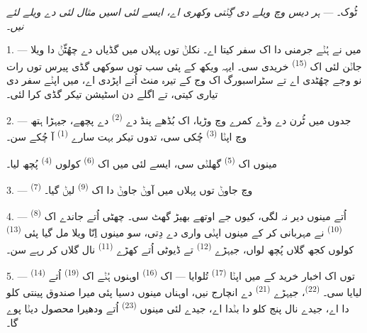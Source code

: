 
\VUsaut{4.0mm}
\VUsaut{2.4mm}
\VUsaut{3.4mm}
\textsc{ٹُوک۔} --- \textit{ہر دیس وچ ویلے دی گِݨتی وکھری اے، ایسے لئی اسیں مثال
لئی}  \textit{دے ویلے لئے نیں۔}

1. --- میں نے ہُݨے جرمنی دا اک سفر کیتا اے۔ نکلݨ توں پہلاں میں گڈیاں دے چھُٹّݨ دا
ویلا جاݨن لئی اک  \textsuperscript{(15)} خریدی سی۔ ایہہ ویکھ
کے پئی سب توں سوکھی گڈی پیرس توں رات نو وجے چھُٹدی اے تے سٹراسبورگ اک وج کے تیرہ
منٹ اُتے اپڑدی اے، میں اپݨے سفر دی تیاری کیتی، تے اگلے دن اسٹیشن تیکر گڈی کرا لئی۔

2. --- جدوں میں ٹُرن دے وڈے کمرے وچ وڑیا، اک بُڈھے پنڈ دے 
\textsuperscript{(2)} دے پچھے، جیہڑا ہتھ وچ اپݨا 
\textsuperscript{(3)} چُکی سی، تدوں تیکر بہت سارے  \textsuperscript{(1)}
آ چُکے سن۔

مینوں اک  \textsuperscript{(5)} گھلݨی سی، ایسے لئی میں اک
 \textsuperscript{(6)} کولوں  \textsuperscript{(4)} پُچھ
لیا۔

3. ---  \textsuperscript{(7)} وچ جاوݨ توں پہلاں میں آوݨ جاوݨ دا
اک  \textsuperscript{(9)} لیݨ گیا۔

4. ---  \textsuperscript{(8)} اُتے مینوں دیر نہ لگی، کیوں جے اوتھے
بھیڑ گھٹ سی۔ چھٹی اُتے جاندے اک  \textsuperscript{(10)} نے مہربانی کر
کے مینوں اپݨی واری دے دِتی، سو مینوں اِنّا ویلا مل گیا پئی
 \textsuperscript{(13)} کولوں کجھ گلاں پُچھ لواں، جیہڑے
 \textsuperscript{(12)} تے ڈیوٹی اُتے کھڑے 
\textsuperscript{(11)} نال گلاں کر رہے سن۔

\VUsaut{3.0mm}

5. ---  \textsuperscript{(14)} توں اک اخبار خرید کے میں
اپݨا  \textsuperscript{(17)} تُلوایا — اک 
\textsuperscript{(16)} اوہنوں ہُݨے اک  \textsuperscript{(19)}
اُتے لیایا سی۔  \textsuperscript{(22)}، جیہڑے 
\textsuperscript{(21)} دے انچارج نیں، اوہناں مینوں دسیا پئی میرا صندوق پینتی کلو دا
اے، جیدے نال پنج کلو دا  بݨدا اے، جیدے لئی مینوں
 \textsuperscript{(23)} اُتے ودھیرا محصول دیݨا پوے گا۔

